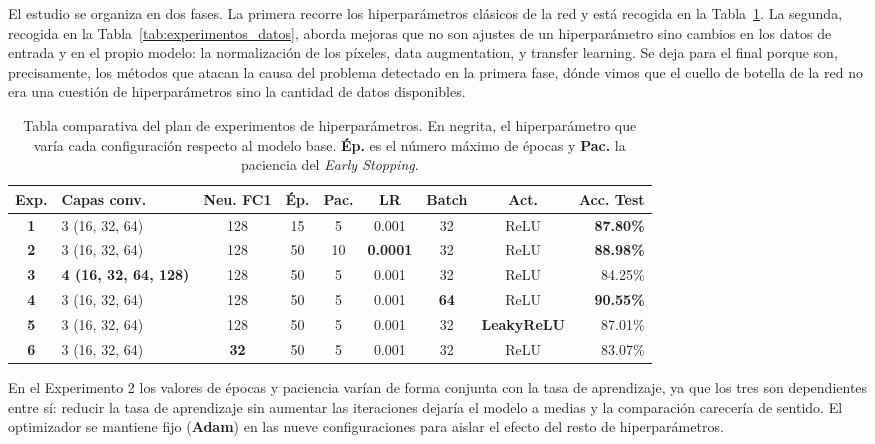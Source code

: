\documentclass[11pt, a4paper]{article}
\begin{document}
El estudio se organiza en dos fases. La primera recorre los hiperparámetros clásicos de la red y está recogida en la Tabla~\ref{tab:experimentos}. La segunda, recogida en la Tabla~\ref{tab:experimentos_datos}, aborda mejoras que no son ajustes de un hiperparámetro sino cambios en los datos de entrada y en el propio modelo: la normalización de los píxeles, data augmentation, y transfer learning. Se deja para el final porque son, precisamente, los métodos que atacan la causa del problema detectado en la primera fase, dónde vimos que el cuello de botella de la red no era una cuestión de hiperparámetros sino la cantidad de datos disponibles.

\begin{table}[H]
\centering
\footnotesize
\caption{Tabla comparativa del plan de experimentos de hiperparámetros. En negrita, el hiperparámetro que varía cada configuración respecto al modelo base. \textbf{Ép.} es el número máximo de épocas y \textbf{Pac.} la paciencia del \textit{Early Stopping}.}
\label{tab:experimentos}
\setlength{\tabcolsep}{3pt}
\begin{tabularx}{\linewidth}{c X c c c c c c r}
\toprule
\textbf{Exp.} & \textbf{Capas conv.} & \textbf{Neu. FC1} & \textbf{Ép.} & \textbf{Pac.} & \textbf{LR} & \textbf{Batch} & \textbf{Act.} & \textbf{Acc. Test} \\
\midrule
\textbf{1} & 3 (16, 32, 64) & 128 & 15 & 5 & 0.001 & 32 & ReLU & \textbf{87.80\%} \\
\textbf{2} & 3 (16, 32, 64) & 128 & 50 & 10 & \textbf{0.0001} & 32 & ReLU & \textbf{88.98\%} \\
\textbf{3} & \textbf{4 (16, 32, 64, 128)} & 128 & 50 & 5 & 0.001 & 32 & ReLU & 84.25\% \\
\textbf{4} & 3 (16, 32, 64) & 128 & 50 & 5 & 0.001 & \textbf{64} & ReLU & \textbf{90.55\%} \\
\textbf{5} & 3 (16, 32, 64) & 128 & 50 & 5 & 0.001 & 32 & \textbf{LeakyReLU} & 87.01\% \\
\textbf{6} & 3 (16, 32, 64) & \textbf{32} & 50 & 5 & 0.001 & 32 & ReLU & 83.07\% \\
\bottomrule
\end{tabularx}
\setlength{\tabcolsep}{6pt}
\end{table}

En el Experimento 2 los valores de épocas y paciencia varían de forma conjunta con la tasa de aprendizaje, ya que los tres son dependientes entre sí: reducir la tasa de aprendizaje sin aumentar las iteraciones dejaría el modelo a medias y la comparación carecería de sentido. El optimizador se mantiene fijo (\textbf{Adam}) en las nueve configuraciones para aislar el efecto del resto de hiperparámetros.
\end{document}
